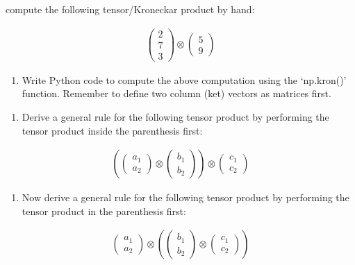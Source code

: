 \documentclass[11pt]{article}
\providecommand{\tightlist}{%
      \setlength{\itemsep}{0pt}\setlength{\parskip}{0pt}}
\begin{document}
compute the following tensor/Kroneckar product by hand:

\begin{align}
\begin{pmatrix}
2 \\ 7 \\ 3
\end{pmatrix} \otimes
\begin{pmatrix}
5 \\ 9
\end{pmatrix}
\end{align}

    \begin{enumerate}
\def\labelenumi{\arabic{enumi}.}
\setcounter{enumi}{1}
\tightlist
\item
  Write Python code to compute the above computation using the
  `np.kron()' function. Remember to define two column (ket) vectors as
  matrices first.
\end{enumerate}

    \begin{enumerate}
\def\labelenumi{\arabic{enumi}.}
\setcounter{enumi}{2}
\tightlist
\item
  Derive a general rule for the following tensor product by performing
  the tensor product inside the parenthesis first:
\end{enumerate}

\begin{align}
\left( \begin{pmatrix}
a_1 \\ a_2
\end{pmatrix} \otimes 
\begin{pmatrix}
b_1 \\ b_2
\end{pmatrix}\right) \otimes 
\begin{pmatrix}
c_1 \\ c_2
\end{pmatrix}
\end{align}

    \begin{enumerate}
\def\labelenumi{\arabic{enumi}.}
\setcounter{enumi}{3}
\tightlist
\item
  Now derive a general rule for the following tensor product by
  performing the tensor product in the parenthesis first:
\end{enumerate}

\begin{align}
\begin{pmatrix}
a_1 \\ a_2
\end{pmatrix} \otimes 
\left( \begin{pmatrix}
b_1 \\ b_2
\end{pmatrix} \otimes 
\begin{pmatrix}
c_1 \\ c_2
\end{pmatrix}\right)
\end{align}
\end{document}
